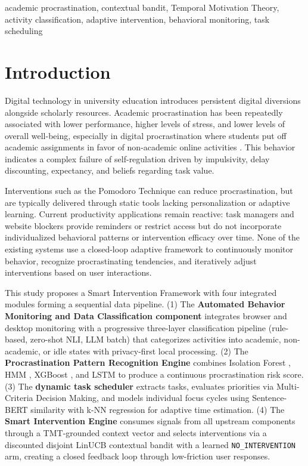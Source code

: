 \documentclass[conference]{IEEEtran}
\begin{document}
\begin{IEEEkeywords}
academic procrastination, contextual bandit, Temporal Motivation Theory, activity classification, adaptive intervention, behavioral monitoring, task scheduling
\end{IEEEkeywords}

\section{Introduction}
Digital technology in university education introduces persistent digital diversions alongside scholarly resources. Academic procrastination has been repeatedly associated with lower performance, higher levels of stress, and lower levels of overall well-being, especially in digital procrastination where students put off academic assignments in favor of non-academic online activities \cite{b1}. This behavior indicates a complex failure of self-regulation driven by impulsivity, delay discounting, expectancy, and beliefs regarding task value.

Interventions such as the Pomodoro Technique \cite{b2} can reduce procrastination, but are typically delivered through static tools lacking personalization or adaptive learning. Current productivity applications remain reactive: task managers and website blockers provide reminders or restrict access but do not incorporate individualized behavioral patterns or intervention efficacy over time. None of the existing systems use a closed-loop adaptive framework to continuously monitor behavior, recognize procrastinating tendencies, and iteratively adjust interventions based on user interactions.

This study proposes a Smart Intervention Framework with four integrated modules forming a sequential data pipeline. (1) The \textbf{Automated Behavior Monitoring and Data Classification component} integrates browser and desktop monitoring with a progressive three-layer classification pipeline (rule-based, zero-shot NLI, LLM batch) that categorizes activities into academic, non-academic, or idle states with privacy-first local processing. (2) The \textbf{Procrastination Pattern Recognition Engine} combines Isolation Forest \cite{b3}, HMM \cite{b4}, XGBoost \cite{b5}, and LSTM \cite{b6} to produce a continuous procrastination risk score. (3) The \textbf{dynamic task scheduler} extracts tasks, evaluates priorities via Multi-Criteria Decision Making, and models individual focus cycles using Sentence-BERT \cite{b7} similarity with k-NN regression for adaptive time estimation. (4) The \textbf{Smart Intervention Engine} consumes signals from all upstream components through a TMT-grounded context vector \cite{b8} and selects interventions via a discounted disjoint LinUCB contextual bandit \cite{b9} with a learned \texttt{NO\_INTERVENTION} arm, creating a closed feedback loop through low-friction user responses.
\end{document}
